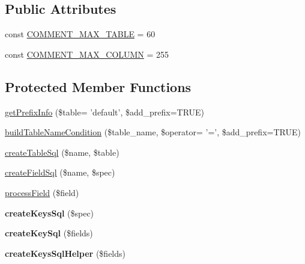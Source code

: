 \subsection*{Public Attributes}
\begin{DoxyCompactItemize}
\item 
const \hyperlink{classDatabaseSchema__mysql_a4d02578a95eabfb2de66accd1b3e8860}{COMMENT\_\-MAX\_\-TABLE} = 60
\item 
const \hyperlink{classDatabaseSchema__mysql_a67b97924e20b8db8df46f05dcc8e6a1d}{COMMENT\_\-MAX\_\-COLUMN} = 255
\end{DoxyCompactItemize}
\subsection*{Protected Member Functions}
\begin{DoxyCompactItemize}
\item 
\hyperlink{classDatabaseSchema__mysql_a83aac7da38db04087cd040d93facf5e7}{getPrefixInfo} (\$table= 'default', \$add\_\-prefix=TRUE)
\item 
\hyperlink{classDatabaseSchema__mysql_ae4fdb93f71666ee453610344b34d6763}{buildTableNameCondition} (\$table\_\-name, \$operator= '=', \$add\_\-prefix=TRUE)
\item 
\hyperlink{classDatabaseSchema__mysql_a1c3bbd91d1589bd9be8a288a45636e58}{createTableSql} (\$name, \$table)
\item 
\hyperlink{classDatabaseSchema__mysql_a293d3636f2bf9512c953b2706c4399d6}{createFieldSql} (\$name, \$spec)
\item 
\hyperlink{classDatabaseSchema__mysql_acd9ed95b051e8cce31c5c48e439ed9f3}{processField} (\$field)
\item 
\hypertarget{classDatabaseSchema__mysql_ad7e74341e03539fa42f137ca2e727bb7}{
{\bfseries createKeysSql} (\$spec)}
\label{classDatabaseSchema__mysql_ad7e74341e03539fa42f137ca2e727bb7}

\item 
\hypertarget{classDatabaseSchema__mysql_ac6c70aa394c3c368dcf73a61b48932d8}{
{\bfseries createKeySql} (\$fields)}
\label{classDatabaseSchema__mysql_ac6c70aa394c3c368dcf73a61b48932d8}

\item 
\hypertarget{classDatabaseSchema__mysql_aef556c2de3271e602da4bbbdafc01f5b}{
{\bfseries createKeysSqlHelper} (\$fields)}
\label{classDatabaseSchema__mysql_aef556c2de3271e602da4bbbdafc01f5b}

\end{DoxyCompactItemize}


